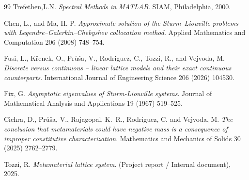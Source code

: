 \documentclass[11pt,a4paper,oneside,openright]{report} %
\let\openright=\cleardoublepage
\begin{document}
\begin{thebibliography}{99}
    {\sc Trefethen,\;L.\;N.}
    \emph{Spectral Methods in MATLAB}.
    SIAM, Philadelphia, 2000.

    {\sc Chen, L., and Ma, H.\;-P.}
    \emph{Approximate solution of the Sturm--Liouville problems with Legendre--Galerkin--Chebyshev collocation method}.
    Applied Mathematics and Computation 206 (2008) 748--754.


    {\sc Fusi, L., K\v{r}enek, O., Pr\r{u}\v{s}a, V., Rodriguez, C., Tozzi, R., and Vejvoda, M.}
    \emph{Discrete versus continuous -- linear lattice models and their exact continuous counterparts}.
    International Journal of Engineering Science 206 (2026) 104530.
    

    {\sc Fix, G.}
    \emph{Asymptotic eigenvalues of Sturm-Liouville systems}.
    Journal of Mathematical Analysis and Applications 19 (1967) 519--525.

    {\sc Cichra, D., Průša, V., Rajagopal, K.~R., Rodriguez, C. and Vejvoda, M.}
    \emph{The conclusion that metamaterials could have negative mass is a consequence of improper constitutive characterization}.
    Mathematics and Mechanics of Solids 30 (2025) 2762--2779.

    {\sc Tozzi, R.}
    \emph{Metamaterial lattice system}.
    (Project report / Internal document), 2025.

    
    
\end{thebibliography}

\appendix
\openright
\end{document}
